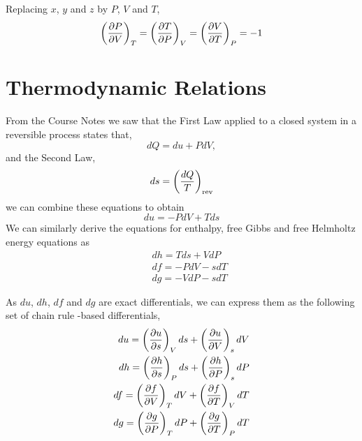 \noindent
Replacing $x$, $y$ and $z$ by $P$, $V$ and $T$,
\begin{equation}
\left(\displaystyle\frac{\partial P}{\partial V}\right)_{T} = \left(\displaystyle\frac{\partial T}{\partial P}\right)_{V} = \left(\displaystyle\frac{\partial V}{\partial T}\right)_{P} = -1
\end{equation}

\section{Thermodynamic Relations}

From the Course Notes we saw that the First Law applied to a closed system in a reversible process states that,
\begin{equation}
dQ= du + PdV, \label{firstlaw_simplified}
\end{equation}
\noindent
and the Second Law,
\begin{equation}
ds=\left(\displaystyle\frac{dQ}{T}\right)_{\text{rev}}
\end{equation}
\noindent
we can combine these equations to obtain
\begin{equation}
du = - PdV + Tds \label{gibbs_eqn0}
\end{equation}
We can similarly derive the equations for enthalpy, free Gibbs and free Helmholtz energy equations as
\begin{eqnarray}
&& dh = Tds + VdP \label{enthalpy_eqn} \\
&& df = -PdV - sdT \label{helmholtz_eqn} \\
&& dg = -VdP -sdT \label{gibbs_eqn}
\end{eqnarray}

\noindent
As $du$, $dh$, $df$ and $dg$ are exact differentials, we can express them as the following set of chain rule -based differentials,
\begin{eqnarray}
du = \left(\frc{\partial u}{\partial  s}\right)_{V}ds + \left(\frc{\partial u}{\partial V}\right)_{s}dV \nonumber \\
%
dh = \left(\frc{\partial h}{\partial  s}\right)_{P}ds + \left(\frc{\partial h}{\partial P}\right)_{s}dP \nonumber \\
%
df = \left(\frc{\partial f}{\partial  V}\right)_{T}dV + \left(\frc{\partial f}{\partial T}\right)_{V}dT \nonumber \\
%
dg = \left(\frc{\partial g}{\partial  P}\right)_{T}dP + \left(\frc{\partial g}{\partial T}\right)_{P}dT \nonumber \\
\end{eqnarray}


